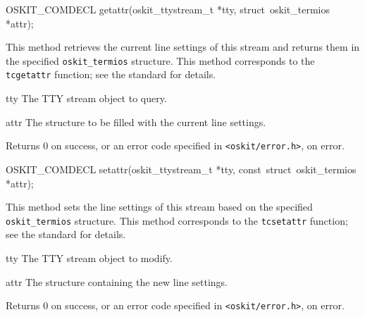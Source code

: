 \begin{apisyn}

	\funcproto OSKIT_COMDECL
	getattr(oskit_ttystream_t *tty, 
		\outparam struct~oskit_termios *attr);
\end{apisyn}
\begin{apidesc}
	This method retrieves the current line settings of this stream
	and returns them in the specified \texttt{oskit_termios} structure.
	This method corresponds to the \posix{} \texttt{tcgetattr} function;
	see the \posix{} standard for details.
\end{apidesc}
\begin{apiparm}
	\item[tty]
		The TTY stream object to query.
	\item[attr]
		The structure to be filled with the current line settings.
\end{apiparm}
\begin{apiret}
	Returns 0 on success, or an error code specified in
	{\tt <oskit/error.h>}, on error.
\end{apiret}

\begin{apisyn}

	\funcproto OSKIT_COMDECL
	setattr(oskit_ttystream_t *tty, 
		const~struct~oskit_termios *attr);
\end{apisyn}
\begin{apidesc}
	This method sets the line settings of this stream
	based on the specified \texttt{oskit_termios} structure.
	This method corresponds to the \posix{} \texttt{tcsetattr} function;
	see the \posix{} standard for details.
\end{apidesc}
\begin{apiparm}
	\item[tty]
		The TTY stream object to modify.
	\item[attr]
		The structure containing the new line settings.
\end{apiparm}
\begin{apiret}
	Returns 0 on success, or an error code specified in
	{\tt <oskit/error.h>}, on error.
\end{apiret}

